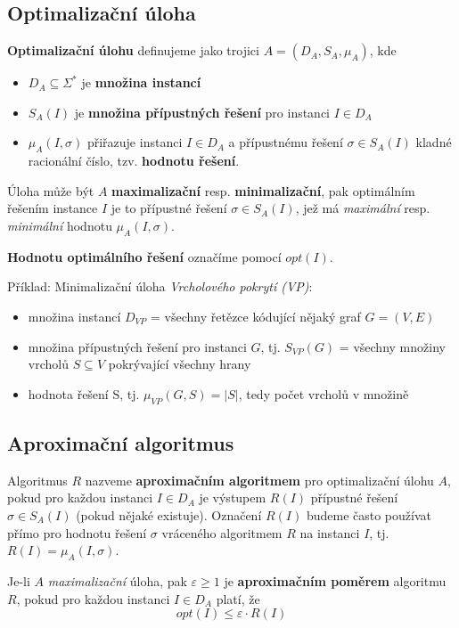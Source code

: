\documentclass[11pt]{report} %
\numberwithin{equation}{section}
\begin{document}
\subsection{Optimalizační úloha}
\textbf{Optimalizační úlohu} definujeme jako trojici $A = (D_A, S_A, \mu_A)$, kde
\begin{itemize}
	
	
	\item $D_A \subseteq \Sigma^*$ je \textbf{množina instancí}
	\item $S_A(I)$ je \textbf{množina přípustných řešení} pro instanci $I \in D_A$
	\item $\mu_A(I, \sigma)$ přiřazuje instanci $I \in D_A$ a přípustnému řešení  $\sigma \in S_A(I)$ kladné racionální číslo, tzv. \textbf{hodnotu řešení}.
\end{itemize}

Úloha může být $A$ \textbf{maximalizační} resp. \textbf{minimalizační}, pak optimálním řešením instance $I$ je to přípustné řešení $\sigma \in S_A(I)$, jež má \textit{maximální} resp. \textit{minimální} hodnotu $\mu_A(I, \sigma)$.

\textbf{Hodnotu optimálního řešení} označíme pomocí $opt(I)$.

Příklad: Minimalizační úloha \textit{Vrcholového pokrytí (VP)}: 
\begin{itemize}
	
	
	\item množina instancí $D_{VP}$ = všechny řetězce kódující nějaký graf $G = (V,E)$	
	\item množina přípustných řešení pro instanci $G$, tj. $S_{VP}(G)$ = všechny množiny vrcholů $S \subseteq V$ pokrývající všechny hrany
	\item hodnota řešení S, tj. $\mu_{VP}(G,S) = |S|$, tedy počet vrcholů v množině
\end{itemize}

\subsection{Aproximační algoritmus}
Algoritmus $R$ nazveme \textbf{aproximačním algoritmem} pro optimalizační úlohu $A$, pokud pro každou instanci $I \in D_A$ je výstupem $R(I)$ přípustné řešení $\sigma \in S_A(I)$ (pokud nějaké existuje). Označení $R(I)$ budeme často používat přímo pro hodnotu řešení $\sigma$ vráceného algoritmem $R$ na instanci $I$, tj. $R(I) = \mu_A(I, \sigma)$.

Je-li $A$ \textit{maximalizační} úloha, pak $\varepsilon \geq 1$ je \textbf{aproximačním poměrem} algoritmu $R$, pokud pro každou instanci $I \in D_A$ platí, že 
$$opt(I) \leq \varepsilon \cdot R(I)$$
\end{document}
